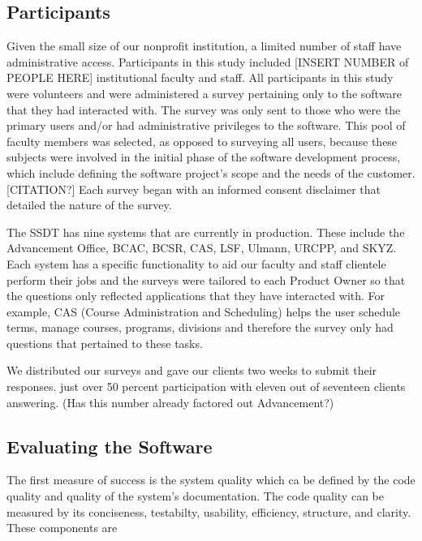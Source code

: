 \subsection{Participants}
Given the small size of our nonprofit institution, a limited number of staff have administrative access. Participants in this study included [INSERT NUMBER of PEOPLE HERE] institutional faculty and staff. All participants in this study were volunteers and were administered a survey pertaining only to the software that they had interacted with. The survey was only sent to those who were the primary users and/or had administrative privileges to the software. This pool of faculty members was selected, as opposed to surveying all users, because these subjects were involved in the initial phase of the software development process, which include defining the software project’s scope and the needs of the customer. [CITATION?] Each survey began with an informed consent disclaimer that detailed the nature of the survey.

The SSDT has nine systems that are currently in production. These include the Advancement Office, BCAC, BCSR, CAS, LSF, Ulmann, URCPP, and SKYZ. Each system has a specific functionality to aid our faculty and staff clientele perform their jobs and the surveys were tailored to each Product Owner so that the questions only reflected applications that they have interacted with. For example, CAS (Course Administration and Scheduling) helps the user schedule terms, manage courses, programs, divisions and therefore the survey only had questions that pertained to these tasks.

We distributed our surveys and gave our clients two weeks to submit their responses. just over 50 percent participation with eleven out of seventeen clients answering. (Has this number already factored out Advancement?)

\subsection{Evaluating the Software}
 The first measure of success is the system quality which ca be defined by the code quality and quality of the system's documentation. The code quality can be measured by its conciseness, testabilty, usability, efficiency, structure, and clarity. These components are

